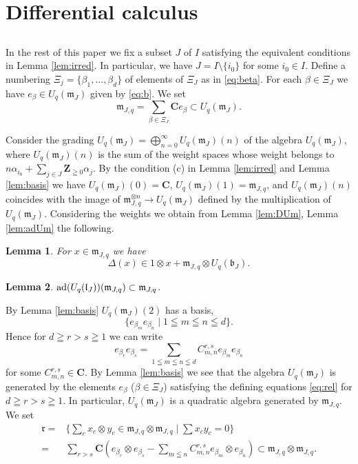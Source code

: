 \documentclass[a4paper, 12pt, leqno]{amsart}
\newtheorem{lemma}{{\sc Lemma}}[section]
\theoremstyle{definition}
\numberwithin{equation}{section}
\def\Gb{{\mathfrak{b}}}
\def\Gl{{\mathfrak{l}}}
\def\Gm{{\mathfrak{m}}}
\def\Gr{{\mathfrak{r}}}
\def\BC{{\mathbf{C}}}
\def\BZ{{\mathbf{Z}}}
\def\ad{{\mathop{\rm ad}\nolimits}}
\def\m{\Gm_{J,q}}
\def\K{U_q(\Gl_J)}
\begin{document}
\section{Differential calculus}
\subsection{}
In the rest of this paper we fix a subset $J$ of $I$ satisfying the equivalent conditions in Lemma \ref{lem:irred}.
In particular, we have $J=I\setminus\{i_0\}$ for some $i_0\in I$.
Define a numbering $\Xi_j=\{\beta_1,\dots, \beta_d\}$ of elements of $\Xi_J$ as in \eqref{eq:beta}.
For each $\beta\in\Xi_J$ we have $e_\beta\in U_q(\Gm_J)$ given  by \eqref{eq:b}.
We set 
\begin{equation}
\m=\sum_{\beta\in\Xi_J}\BC e_\beta
\subset U_q(\Gm_J).
\end{equation}


Consider the grading 
$
U_q(\Gm_J)=\bigoplus_{n=0}^\infty U_q(\Gm_J)(n)
$
of the algebra $U_q(\Gm_J)$, where $U_q(\Gm_J)(n)$
is the sum of the weight spaces whose weight belongs  to 
$n\alpha_{i_0}+\sum_{j\in J}\BZ_{\geqq0}\alpha_j$.
By the condition (c) in Lemma \ref{lem:irred} and Lemma \ref{lem:basis}
we have 
$U_q(\Gm_J)(0)=\BC$,
$U_q(\Gm_J)(1)=\m$, and $U_q(\Gm_J)(n)$ coincides with the image of 
$\m^{\otimes n}\to U_q(\Gm_J)$ defined by the multiplication of $U_q(\Gm_J)$.
Considering the weights we obtain from Lemma \ref{lem:DUm}, Lemma \ref{lem:adUm} the following.


\begin{lemma}
\label{lem:Dm}
For $x\in\m$ we have
\[
\Delta(x)\in 1\otimes x+\m\otimes U_q(\Gb_J).
\]
\end{lemma}



\begin{lemma}
\label{lem:adm}
$\ad(\K)(\m)\subset\m$.
\end{lemma}




By Lemma \ref{lem:basis} $U_q(\Gm_J)(2)$ has a basis,
\[
\{e_{\beta_m}e_{\beta_n}\mid 1\leqq m\leqq n\leqq d\}.
\]
Hence for $d\geqq r>s\geqq 1$ we can write 
\begin{equation}
\label{eq:rel}
e_{\beta_r}e_{\beta_s}=
\sum_{1\leqq m\leqq n\leqq d}C^{r,s}_{m,n}e_{\beta_m}e_{\beta_n}
\end{equation}
for some $C^{r,s}_{m,n}\in\BC$.
By Lemma \ref{lem:basis} we see that the algebra $U_q(\Gm_J)$ is generated by the elements $e_\beta$ ($\beta\in\Xi_J$) satisfying the defining equations \eqref{eq:rel} for $d\geqq r>s\geqq 1$.
In particular, $U_q(\Gm_J)$ is a quadratic algebra generated by $\m$.
We set
\begin{align}
\Gr=&
\{\sum_c x_c\otimes y_c\in\m\otimes\m\mid
\sum x_cy_c=0\}
\\
\nonumber
=&\sum_{r>s}\BC(e_{\beta_r}\otimes e_{\beta_s}-
\sum_{m\leqq n}C^{r,s}_{m,n}e_{\beta_m}\otimes e_{\beta_n})
\subset \m\otimes\m.
\end{align}
\end{document}
